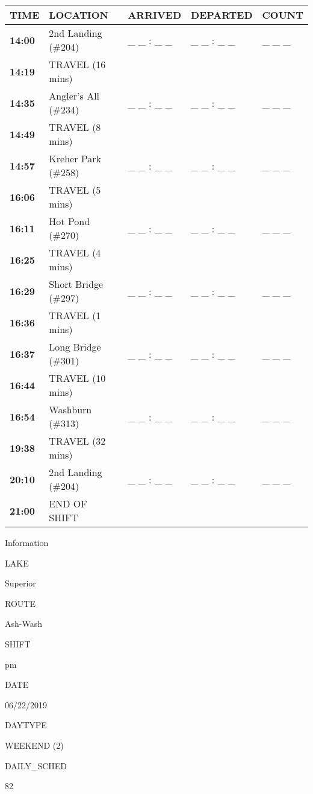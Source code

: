 \documentclass[]{article}
\begin{document}
\begin{tabular}{>{\bfseries}lllll}
\toprule
\textbf{TIME} & \textbf{LOCATION} & \textbf{ARRIVED} & \textbf{DEPARTED} & \textbf{COUNT}\\
\midrule
14:00 & 2nd Landing (\#204) & \_ \_ : \_ \_ & \_ \_ : \_ \_ & \_ \_ \_\\
14:19 & TRAVEL (16 mins) &  &  & \\
14:35 & Angler's All (\#234) & \_ \_ : \_ \_ & \_ \_ : \_ \_ & \_ \_ \_\\
14:49 & TRAVEL (8 mins) &  &  & \\
14:57 & Kreher Park (\#258) & \_ \_ : \_ \_ & \_ \_ : \_ \_ & \_ \_ \_\\
16:06 & TRAVEL (5 mins) &  &  & \\
16:11 & Hot Pond (\#270) & \_ \_ : \_ \_ & \_ \_ : \_ \_ & \_ \_ \_\\
16:25 & TRAVEL (4 mins) &  &  & \\
16:29 & Short Bridge (\#297) & \_ \_ : \_ \_ & \_ \_ : \_ \_ & \_ \_ \_\\
16:36 & TRAVEL (1 mins) &  &  & \\
16:37 & Long Bridge (\#301) & \_ \_ : \_ \_ & \_ \_ : \_ \_ & \_ \_ \_\\
16:44 & TRAVEL (10 mins) &  &  & \\
16:54 & Washburn (\#313) & \_ \_ : \_ \_ & \_ \_ : \_ \_ & \_ \_ \_\\
19:38 & TRAVEL (32 mins) &  &  & \\
20:10 & 2nd Landing (\#204) & \_ \_ : \_ \_ & \_ \_ : \_ \_ & \_ \_ \_\\
21:00 & END OF SHIFT &  &  & \\
\bottomrule
\end{tabular}\newpage

Information

LAKE

Superior

ROUTE

Ash-Wash

SHIFT

pm

DATE

06/22/2019

DAYTYPE

WEEKEND (2)

DAILY\_SCHED

82

\vspace{24pt}
\end{document}
